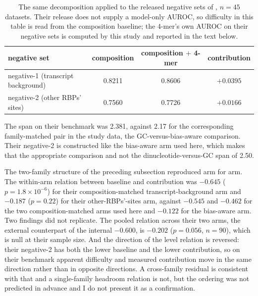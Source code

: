 \begin{table}[htbp]
\centering
\caption{The same decomposition applied to the released negative sets of
\citet{horlacher2023}, $n=45$ datasets. Their release does not supply a model-only AUROC, so
difficulty in this table is read from the composition baseline; the 4-mer's own AUROC on their
negative sets is computed by this study and reported in the text below.}
\label{tab:external}
\begin{tabular}{lccc}
\toprule
negative set & composition & composition $+$ 4-mer & contribution \\
\midrule
negative-1 (transcript background) & 0.8211 & 0.8606 & $+0.0395$ \\
negative-2 (other RBPs' sites) & 0.7560 & 0.7726 & $+0.0166$ \\
\bottomrule
\end{tabular}
\end{table}

The span on their benchmark was 2.381, against 2.17 for the corresponding family-matched pair in
the study data, the GC-versus-bias-aware comparison. Their negative-2 is constructed like the
bias-aware arm used here, which makes that the appropriate comparison and not the
dinucleotide-versus-GC span of 2.50.

The two-family structure of the preceding subsection reproduced arm for arm. The within-arm
relation between baseline and contribution was $-0.645$ ($p=1.8\times10^{-6}$) for their
composition-matched transcript-background arm and $-0.187$ ($p=0.22$) for their other-RBPs'-sites
arm, against $-0.545$ and $-0.462$ for the two composition-matched arms used here and $-0.122$ for the
bias-aware arm. Two findings did not replicate. The pooled relation across their two arms, the external counterpart of the internal
$-0.600$, is $-0.202$ ($p=0.056$, $n=90$), which is null at their sample size. And the direction
of the level relation is reversed: their negative-2 has both the lower baseline and the lower
contribution, so on their benchmark apparent difficulty and measured contribution move in the
same direction rather than in opposite directions. A cross-family residual is consistent with
that and a single-family headroom relation is not, but the ordering was not predicted in advance
and I do not present it as a confirmation.

